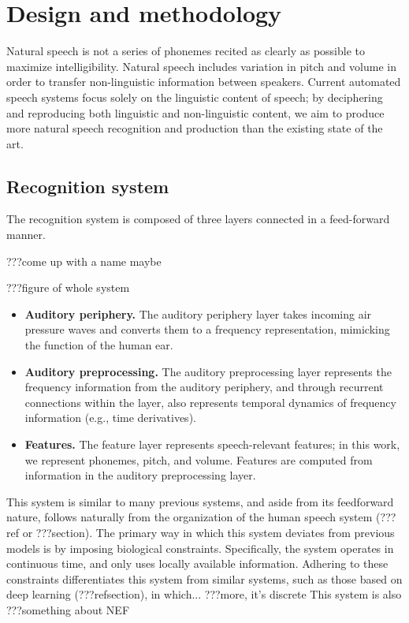 \chapter{Design and methodology}



Natural speech is not a series of phonemes
recited as clearly as possible
to maximize intelligibility.
Natural speech includes variation in
pitch and volume in order to transfer
non-linguistic information between speakers.
Current automated speech systems
focus solely on the linguistic content
of speech;
by deciphering and reproducing both
linguistic and non-linguistic content,
we aim to produce more natural speech
recognition and production
than the existing state of the art.

\section{Recognition system}

The recognition system is composed of
three layers connected in a feed-forward manner.

???come up with a name maybe

???figure of whole system

\begin{itemize}
\item \textbf{Auditory periphery.} The auditory periphery layer
  takes incoming air pressure waves and converts them
  to a frequency representation,
  mimicking the function of the human ear.
\item \textbf{Auditory preprocessing.} The auditory preprocessing layer
  represents the frequency information from the auditory periphery,
  and through recurrent connections within the layer,
  also represents temporal dynamics of frequency information
  (e.g., time derivatives).
\item \textbf{Features.} The feature layer
  represents speech-relevant features;
  in this work, we represent phonemes, pitch, and volume.
  Features are computed from information
  in the auditory preprocessing layer.
\end{itemize}

This system is similar to many previous systems,
and aside from its feedforward nature,
follows naturally from the organization
of the human speech system (???ref or ???section).
The primary way in which this system
deviates from previous models
is by imposing biological constraints.
Specifically, the system operates
in continuous time,
and only uses locally available information.
Adhering to these constraints differentiates
this system from similar systems,
such as those based on deep learning (???refsection),
in which... ???more, it's discrete
This system is also ???something about NEF

